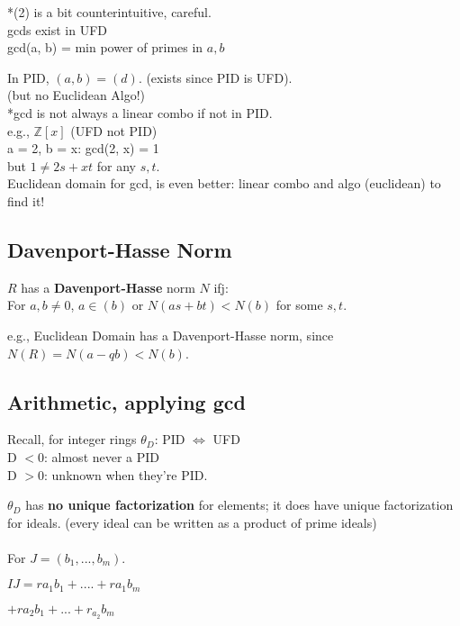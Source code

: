 \documentclass[12pt]{article}
\begin{document}
*(2) is a bit counterintuitive, careful.\\

gcds exist in UFD\\
\textcolor[gray]{0.5}{gcd(a, b) = min power of primes in $a, b$}

In PID, $(a, b) = (d)$. (exists since PID is UFD).\\
(but no Euclidean Algo!)\\

*gcd is not always a linear combo if not in PID.\\
e.g., $\mathbb{Z}[x]$ (UFD not PID) \\
a = 2, b = x: gcd(2, x) = 1 \\
but $1 \neq 2s + xt$ for any $s, t$.\\

Euclidean domain for gcd, is even better: linear combo and algo (euclidean) to find it!\\
\subsection*{Davenport-Hasse Norm}

$R$ has a \textbf{Davenport-Hasse} norm $N$ ifj: \\
For $a, b \neq 0$, $a \in (b)$ or $N(as+bt) < N(b)$ for some $s, t$.

e.g., Euclidean Domain has a Davenport-Hasse norm, since $N(R) = N(a -qb) < N(b)$.

\subsection*{Arithmetic, applying gcd}

Recall, for integer rings $\theta_D$: PID $\iff$ UFD\\
D $< 0$: almost never a PID\\
D $> 0$: unknown when they're PID. 

$\theta_D$ has \textbf{no unique factorization} for elements; it does have unique factorization for ideals. (every ideal can be written as a product of prime ideals)\\


\\
For $J = (b_1, ..., b_m)$.\\
\centerline{$IJ = ra_1b_1 + .... + ra_1b_m$ \\}
\centerline{$+ ra_2 b_1 + ... + r_a_2 b_m$}\\
\ \\
\end{document}
